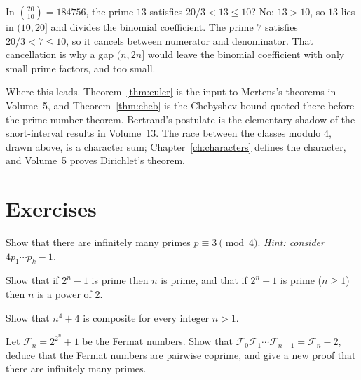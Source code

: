 \begin{examplex}
In $\binom{20}{10}=184756$, the prime $13$ satisfies $20/3<13\le 10$? No: $13>10$, so $13$ lies in $(10,20]$ and divides the binomial coefficient. The prime $7$ satisfies $20/3<7\le 10$, so it cancels between numerator and denominator. That cancellation is why a gap $(n,2n]$ would leave the binomial coefficient with only small prime factors, and too small.
\end{examplex}

\begin{beauty}
Where this leads. Theorem~\ref{thm:euler} is the input to Mertens's theorems in Volume~5, and Theorem~\ref{thm:cheb} is the Chebyshev bound quoted there before the prime number theorem. Bertrand's postulate is the elementary shadow of the short-interval results in Volume~13. The race between the classes modulo $4$, drawn above, is a character sum; Chapter~\ref{ch:characters} defines the character, and Volume~5 proves Dirichlet's theorem.
\end{beauty}

\section{Exercises}

\begin{exercise}[$\star$]\label{ex:mod4}
Show that there are infinitely many primes $p\equiv3\pmod4$. \emph{Hint: consider $4p_1\cdots p_k-1$.}
\end{exercise}

\begin{exercise}[$\star$]\label{ex:mersenne}
Show that if $2^n-1$ is prime then $n$ is prime, and that if $2^n+1$ is prime ($n\ge1$) then $n$ is a power of $2$.
\end{exercise}

\begin{exercise}[$\star$]\label{ex:germain}
Show that $n^4+4$ is composite for every integer $n>1$.
\end{exercise}

\begin{exercise}[$\star\star$]\label{ex:fermatnum}
Let $\mathcal F_n=2^{2^n}+1$ be the Fermat numbers. Show that $\mathcal F_0\mathcal F_1\cdots\mathcal F_{n-1}=\mathcal F_n-2$, deduce that the Fermat numbers are pairwise coprime, and give a new proof that there are infinitely many primes.
\end{exercise}

